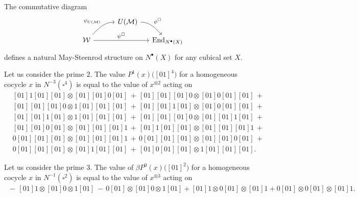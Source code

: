 \begin{theorem}
	The commutative diagram
	\begin{equation*}
	\begin{tikzcd}[column sep = small, row sep = small]
	&[18pt] U(\mathcal M) \arrow[dr, "\phi^\square", out=0] &[-0pt] \\
	\mathcal W \arrow[ur, "\psi_{U(\mathcal M)}", in=180] \arrow[rr, "\psi^\square"] & & \End_{N^\bullet (X)}
	\end{tikzcd}
	\end{equation*}
	defines a natural May-Steenrod structure on $N^\bullet(X)$ for any cubical set $X$.
\end{theorem}

\begin{example}
	Let us consider the prime $2$. The value $P^1(x)\big([01]^{4}\big)$ for a homogeneous cocycle $x$ in $N^{-3}(\square^4)$ is equal to the value of $x^{\otimes 2}$ acting on
	\begin{align*}&
	[01]1[01][01] \otimes [01][01]0[01]\,+\,
	[01][01][01]0 \otimes [01]0[01][01]\,+\, \\&
	[01][01][01]0 \otimes 1[01][01][01]\,+\,
	[01][01]1[01] \otimes [01]0[01][01]\,+\, \\&
	[01][01]1[01] \otimes 1[01][01][01]\,+\,
	[01][01][01]0 \otimes [01][01]1[01]\,+\, \\&
	[01][01]0[01] \otimes [01][01][01]1\,+\,
	[01]1[01][01] \otimes [01][01][01]1\,+\, \\&
	0[01][01][01] \otimes [01][01][01]1\,+\,
	0[01][01][01] \otimes [01][01]0[01]\,+\, \\&
	0[01][01][01] \otimes [01]1[01][01]\,+\,
	[01]0[01][01] \otimes 1[01][01][01].\,\phantom{+}\,
	\end{align*}
\end{example}

\begin{example}
	Let us consider the prime $3$. The value of $\beta P^0(x)\big([01]^2\big)$ for a homogeneous cocycle $x$ in $N^{-1}(\square^2)$ is equal to the value of $x^{\otimes 3}$ acting on
	\begin{align*}
	\,-\, [01]1 \otimes [01]0 \otimes 1[01] \,-\, 0[01] \otimes [01]0 \otimes 1[01] + [01]1 \otimes 0[01] \otimes [01]1 + 0[01] \otimes 0[01] \otimes [01]1.
	\end{align*}
\end{example}

